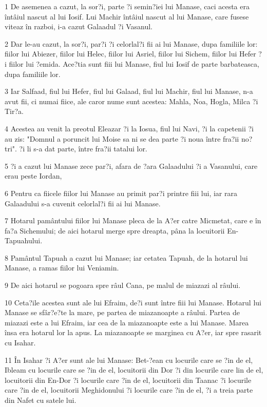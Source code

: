 \par 1 De asemenea a cazut, la sor?i, parte ?i semin?iei lui Manase, caci acesta era întâiul nascut al lui Iosif. Lui Machir întâiul nascut al lui Manase, care fusese viteaz în razboi, i-a cazut Galaadul ?i Vasanul.
\par 2 Dar le-au cazut, la sor?i, par?i ?i celorlal?i fii ai lui Manase, dupa familiile lor: fiilor lui Abiezer, fiilor lui Helec, fiilor lui Asriel, fiilor lui Sichem, fiilor lui Hefer ?i fiilor lui ?emida. Ace?tia sunt fiii lui Manase, fiul lui Iosif de parte barbateasca, dupa familiile lor.
\par 3 Iar Salfaad, fiul lui Hefer, fiul lui Galaad, fiul lui Machir, fiul lui Manase, n-a avut fii, ci numai fiice, ale caror nume sunt acestea: Mahla, Noa, Hogla, Milca ?i Tir?a.
\par 4 Acestea au venit la preotul Eleazar ?i la Iosua, fiul lui Navi, ?i la capetenii ?i au zis: "Domnul a poruncit lui Moise sa ni se dea parte ?i noua între fra?ii no?tri". ?i li s-a dat parte, între fra?ii tatalui lor.
\par 5 ?i a cazut lui Manase zece par?i, afara de ?ara Galaadului ?i a Vasanului, care erau peste Iordan,
\par 6 Pentru ca fiicele fiilor lui Manase au primit par?i printre fiii lui, iar rara Galaadului s-a cuvenit celorlal?i fii ai lui Manase.
\par 7 Hotarul pamântului fiilor lui Manase pleca de la A?er catre Micmetat, care e în fa?a Sichemului; de aici hotarul merge spre dreapta, pâna la locuitorii En-Tapuahului.
\par 8 Pamântul Tapuah a cazut lui Manase; iar cetatea Tapuah, de la hotarul lui Manase, a ramas fiilor lui Veniamin.
\par 9 De aici hotarul se pogoara spre râul Cana, pe malul de miazazi al râului.
\par 10 Ceta?ile acestea sunt ale lui Efraim, de?i sunt între fiii lui Manase. Hotarul lui Manase se sfâr?e?te la mare, pe partea de miazanoapte a râului. Partea de miazazi este a lui Efraim, iar cea de la miazanoapte este a lui Manase. Marea însa era hotarul lor la apus. La miazanoapte se marginea cu A?er, iar spre rasarit cu Isahar.
\par 11 În Isahar ?i A?er sunt ale lui Manase: Bet-?ean cu locurile care se ?in de el, Ibleam cu locurile care se ?in de el, locuitorii din Dor ?i din locurile care lin de el, locuitorii din En-Dor ?i locurile care ?in de el, locuitorii din Taanac ?i locurile care ?in de el, locuitorii Meghidonului ?i locurile care ?in de el, ?i a treia parte din Nafet cu satele lui.
